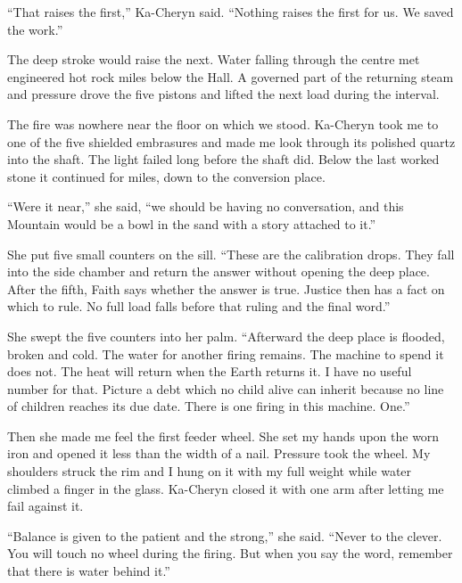 ``That raises the first,'' Ka-Cheryn said. ``Nothing raises the first for us. We saved the work.''\par

The deep stroke would raise the next. Water falling through the centre met engineered hot rock miles below the Hall. A governed part of the returning steam and pressure drove the five pistons and lifted the next load during the interval.\par

The fire was nowhere near the floor on which we stood. Ka-Cheryn took me to one of the five shielded embrasures and made me look through its polished quartz into the shaft. The light failed long before the shaft did. Below the last worked stone it continued for miles, down to the conversion place.\par

``Were it near,'' she said, ``we should be having no conversation, and this Mountain would be a bowl in the sand with a story attached to it.''\par

She put five small counters on the sill. ``These are the calibration drops. They fall into the side chamber and return the answer without opening the deep place. After the fifth, Faith says whether the answer is true. Justice then has a fact on which to rule. No full load falls before that ruling and the final word.''\par

She swept the five counters into her palm. ``Afterward the deep place is flooded, broken and cold. The water for another firing remains. The machine to spend it does not. The heat will return when the Earth returns it. I have no useful number for that. Picture a debt which no child alive can inherit because no line of children reaches its due date. There is one firing in this machine. One.''\par

Then she made me feel the first feeder wheel. She set my hands upon the worn iron and opened it less than the width of a nail. Pressure took the wheel. My shoulders struck the rim and I hung on it with my full weight while water climbed a finger in the glass. Ka-Cheryn closed it with one arm after letting me fail against it.\par

``Balance is given to the patient and the strong,'' she said. ``Never to the clever. You will touch no wheel during the firing. But when you say the word, remember that there is water behind it.''\par

